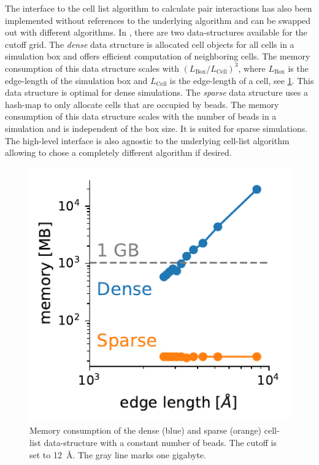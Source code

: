 \documentclass[12pt, twoside]{report}
\begin{document}
The interface to the cell list algorithm to calculate pair interactions has also
been implemented without references to the underlying algorithm and can be
swapped out with different algorithms. In \complexes, there are two
data-structures available for the cutoff grid. The \textit{dense} data structure
is allocated cell objects for all cells in a simulation box and offers efficient
computation of neighboring cells. The memory consumption of this data structure
scales with \((L_{\mathrm{Box}}/L_{\mathrm{Cell}})^3\), where
\(L_{\mathrm{Box}}\) is the edge-length of the simulation box and
\(L_{\mathrm{Cell}}\) is the edge-length of a cell, see
\cref{fig:container-memory-scaling}. This data structure is optimal for dense
simulations. The \textit{sparse} data structure uses a hash-map to only allocate
cells that are occupied by beads. The memory consumption of this data structure
scales with the number of beads in a simulation and is independent of the box
size. It is suited for sparse simulations. The high-level interface is also
agnostic to the underlying cell-list algorithm allowing to chose a completely
different algorithm if desired.
\begin{figure}[!ht]
  \centering
  \includegraphics{figures/container-memory-scaling}
  \caption{Memory consumption of the dense (blue) and sparse (orange) cell-list
    data-structure with a constant number of beads. The cutoff is set to
    \SI{12}{\AA}. The gray line marks one gigabyte.}
\label{fig:container-memory-scaling}
\end{figure}
\end{document}
